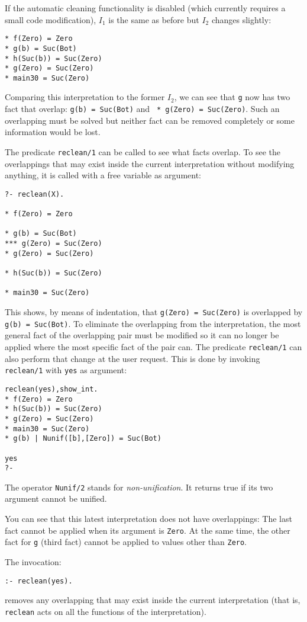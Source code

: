 \documentclass[11pt,a4paper,twoside,openright]{book}
\begin{document}
If the automatic cleaning functionality is disabled (which currently
requires a small code modification), $I_1$ is the same as before but
$I_2$ changes slightly:

\begin{verbatim}
* f(Zero) = Zero
* g(b) = Suc(Bot)
* h(Suc(b)) = Suc(Zero)
* g(Zero) = Suc(Zero)
* main30 = Suc(Zero)
\end{verbatim}

\noindent
Comparing this interpretation to the former $I_2$, we can see that
{\tt g} now has two fact that overlap: {\tt * g(b) = Suc(Bot)} and {\tt
  * g(Zero) = Suc(Zero)}. Such an overlapping must be solved but
neither fact can be removed completely or some information would be
lost.

The predicate {\tt reclean/1} can be called to see what facts
overlap. To see the overlappings that may exist inside the current
interpretation without modifying anything, it is called with a free
variable as argument:

\begin{verbatim}
?- reclean(X).

* f(Zero) = Zero

* g(b) = Suc(Bot)
*** g(Zero) = Suc(Zero)
* g(Zero) = Suc(Zero)

* h(Suc(b)) = Suc(Zero)

* main30 = Suc(Zero)
\end{verbatim}

\noindent
This shows, by means of indentation, that {\tt g(Zero) = Suc(Zero)} is
overlapped by {\tt * g(b) = Suc(Bot)}. To eliminate the overlapping
from the interpretation, the most general fact of the overlapping pair
must be modified so it can no longer be applied where the most
specific fact of the pair can. The predicate {\tt reclean/1} can also
perform that change at the user request. This is done by invoking {\tt
  reclean/1} with {\tt yes} as argument:

\begin{verbatim}
reclean(yes),show_int.
* f(Zero) = Zero
* h(Suc(b)) = Suc(Zero)
* g(Zero) = Suc(Zero)
* main30 = Suc(Zero)
* g(b) | Nunif([b],[Zero]) = Suc(Bot)

yes
?- 
\end{verbatim}   

\noindent
The operator {\tt Nunif/2} stands for {\em non-unification}. It
returns true if its two argument cannot be unified.

You can see that this latest interpretation does not have
overlappings: The last fact cannot be applied when its argument is
{\tt Zero}. At the same time, the other fact for {\tt g} (third fact)
cannot be applied to values other than {\tt Zero}. 

The invocation:

\begin{verbatim}
:- reclean(yes).
\end{verbatim}

\noindent
removes any overlapping that may exist inside the current
interpretation (that is, {\tt reclean} acts on all the functions of the
interpretation). 
\end{document}
